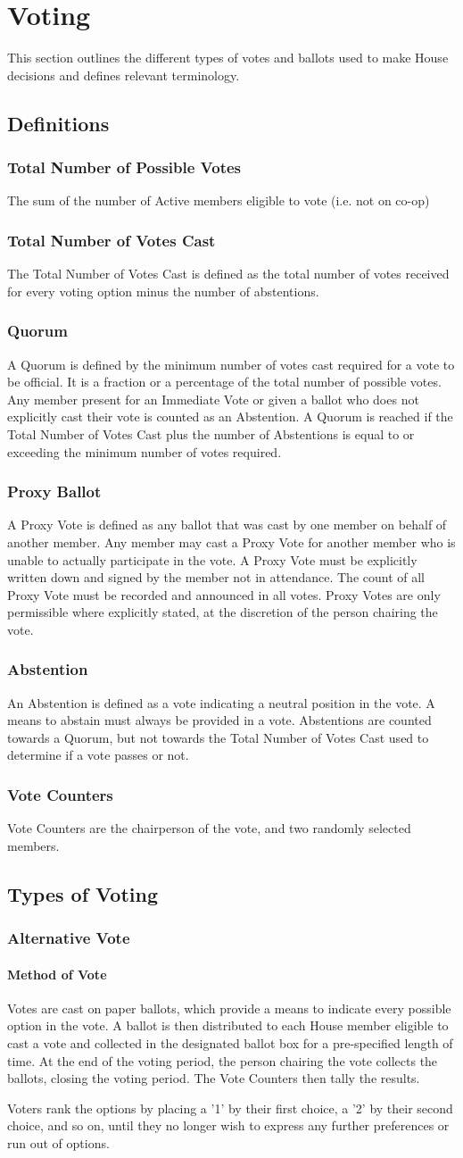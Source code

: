 \documentclass{article}
\newcommand{\article}[1]{\section{#1} \label{#1}}
\newcommand{\asection}[1]{\subsection{#1} \label{#1}}
\newcommand{\asubsection}[1]{\subsubsection{#1} \label{#1}}
\newcommand{\asubsubsection}[1]{\paragraph{#1} \label{#1}}
\begin{document}
\article{Voting}
This section outlines the different types of votes and ballots used to make House decisions and defines relevant terminology.
\asection{Definitions}
\asubsection{Total Number of Possible Votes}
The sum of the number of Active members eligible to vote (i.e. not on co-op)
\asubsection{Total Number of Votes Cast}
The Total Number of Votes Cast is defined as the total number of votes received for every voting option minus the number of abstentions.
\asubsection{Quorum}
A Quorum is defined by the minimum number of votes cast required for a vote to be official.
It is a fraction or a percentage of the total number of possible votes.
Any member present for an Immediate Vote or given a ballot who does not explicitly cast their vote is counted as an Abstention.
A Quorum is reached if the Total Number of Votes Cast plus the number of Abstentions is equal to or exceeding the minimum number of votes required.
\asubsection{Proxy Ballot}
A Proxy Vote is defined as any ballot that was cast by one member on behalf of another member.
Any member may cast a Proxy Vote for another member who is unable to actually participate in the vote.
A Proxy Vote must be explicitly written down and signed by the member not in attendance.
The count of all Proxy Vote must be recorded and announced in all votes.
Proxy Votes are only permissible where explicitly stated, at the discretion of the person chairing the vote.
\asubsection{Abstention}
An Abstention is defined as a vote indicating a neutral position in the vote.
A means to abstain must always be provided in a vote.
Abstentions are counted towards a Quorum, but not towards the Total Number of Votes Cast used to determine if a vote passes or not.
\asubsection{Vote Counters}
Vote Counters are the chairperson of the vote, and two randomly selected members.

\asection{Types of Voting}
\asubsection{Alternative Vote}
\asubsubsection{Method of Vote}
Votes are cast on paper ballots, which provide a means to indicate every possible option in the vote. A ballot is then distributed to each House member eligible to cast a vote and collected in the designated ballot box for a pre-specified length of time. At the end of the voting period, the person chairing the vote collects the ballots, closing the voting period. The Vote Counters then tally the results.

Voters rank the options by placing a '1' by their first choice, a '2' by their second choice, and so on, until they no longer wish to express any further preferences or run out of options.
\end{document}
